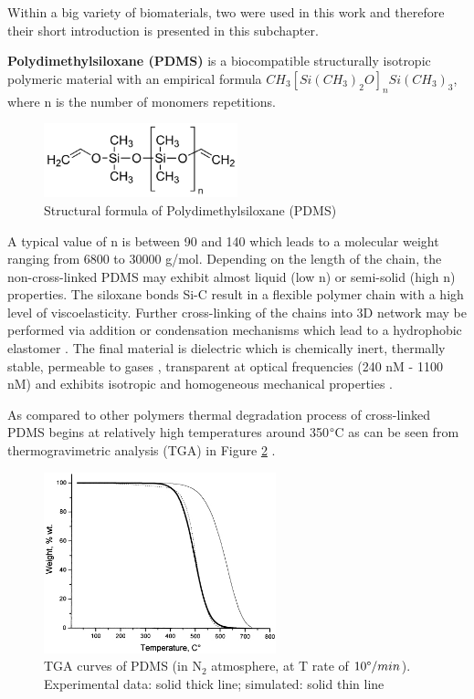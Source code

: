 Within a big variety of biomaterials, two were used in this work and therefore their short introduction is presented in this subchapter.

\textbf{Polydimethylsiloxane (PDMS)} is a biocompatible \cite{wipff_covalent_2009}  structurally isotropic polymeric material with an empirical formula $CH_3[Si(CH_3)_2O]_nSi(CH_3)_3$, where n is the number of monomers repetitions. 


\begin{figure}[H]
\centering
\includegraphics[width=0.5\textwidth]{Figures/Theory/PDMS-aldrich-large.png}
\medskip
\captionsetup{width=0.5\linewidth}
\caption{Structural formula of Polydimethylsiloxane (PDMS) \cite{PDMS_chem}}
\label{fig:PDMS-chem}
\end{figure}

A typical value of n is between 90 and 140 which leads to a molecular weight ranging from 6800 to 30000 g/mol. Depending on the length of the chain, the non-cross-linked PDMS may exhibit almost liquid (low n) or semi-solid (high n) properties. The siloxane bonds Si-C result in a flexible polymer chain with a high level of viscoelasticity. Further cross-linking of the chains into 3D network may be performed via addition or condensation mechanisms which lead to a hydrophobic elastomer \cite{ramli_cross-link_2011}. The final material is dielectric which is chemically inert, thermally  stable, permeable  to  gases \cite{prado_polydimethylsiloxane_2008}, transparent at optical frequencies (240 nM - 1100 nM) and exhibits isotropic and homogeneous mechanical properties \cite{wang_crosslinking_2014}.

As compared to other polymers thermal degradation process of cross-linked PDMS begins at relatively high temperatures around 350$\degree$C as can be seen from thermogravimetric analysis (TGA) in Figure \ref{fig:PDMS-thermo} \cite{camino_polydimethylsiloxane_2001}.

\begin{figure}[H]
\centering
\includegraphics[width=0.6\textwidth]{Figures/Theory/PDMS-thermal-degradation.jpg}
\medskip
\captionsetup{width=0.7\linewidth}
\caption{TGA curves of PDMS (in N$_2$ atmosphere, at T rate of $10 \degree/min$). Experimental data: solid thick line; simulated: solid thin line \cite{camino_polydimethylsiloxane_2001}}
\label{fig:PDMS-thermo}
\end{figure}

